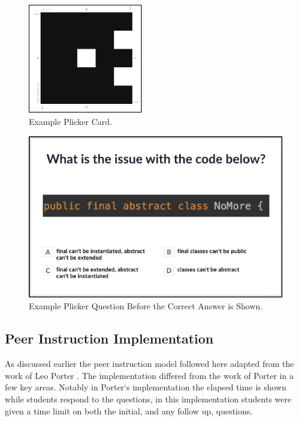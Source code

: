 \documentclass[12pt]{article}
\begin{document}
\begin{figure}[ht]
  \centering
  \includegraphics[width=50mm,scale=0.5]{plicker_card.png}
  \caption{Example Plicker Card.}
  \label{fig:plicker_card}
\end{figure}
\begin{figure}[ht]
  \includegraphics[width=\linewidth]{plicker_question.png}
  \caption{Example Plicker Question Before the Correct Answer is Shown.}
  \label{fig:plicker_question}
\end{figure}


\subsection{Peer Instruction Implementation}

As discussed earlier the peer instruction model followed here adapted from the work of Leo Porter \cite{porterPeerInstructionStudents2011}. The implementation differed from the work of Porter in a few key areas. Notably in Porter`s implementation the elapsed time is shown while students respond to the questions, in this implementation students were given a time limit on both the initial, and any follow up, questions. 
\end{document}
